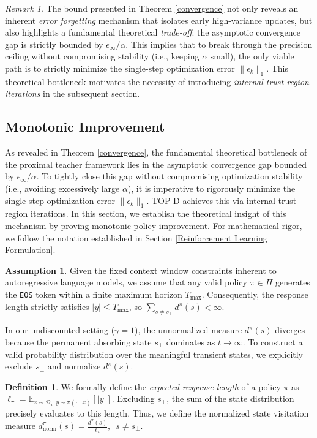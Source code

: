 \documentclass{article}
\theoremstyle{plain}
\theoremstyle{definition}
\newtheorem{definition}[theorem]{Definition}
\newtheorem{assumption}[theorem]{Assumption}
\theoremstyle{remark}
\newtheorem{remark}[theorem]{Remark}
\begin{document}
\begin{remark}
	The bound presented in Theorem \ref{convergence} not only reveals an inherent \textit{error forgetting} mechanism that isolates early high-variance updates, but also highlights a fundamental theoretical \textit{trade-off}: the asymptotic convergence gap is strictly bounded by $\epsilon_\infty/\alpha$. This implies that to break through the precision ceiling without compromising stability (i.e., keeping $\alpha$ small), the only viable path is to strictly minimize the single-step optimization error $\lVert\epsilon_k\rVert_1$. This theoretical bottleneck motivates the necessity of introducing \textit{internal trust region iterations} in the subsequent section.
\end{remark}


\subsection{Monotonic Improvement}\label{Monotonic Improvement}
As revealed in Theorem \ref{convergence}, the fundamental theoretical bottleneck of the proximal teacher framework lies in the asymptotic convergence gap bounded by $\epsilon_\infty/\alpha$. To tightly close this gap without compromising optimization stability (i.e., avoiding excessively large $\alpha$), it is imperative to rigorously minimize the single-step optimization error $\lVert\epsilon_k\rVert_1$. TOP-D achieves this via internal trust region iterations. In this section, we establish the theoretical insight of this mechanism by proving monotonic policy improvement. For mathematical rigor, we follow the notation established in Section \ref{Reinforcement Learning Formulation}.
\begin{assumption}\label{assumption 2}
	Given the fixed context window constraints inherent to autoregressive language models, we assume that any valid policy $\pi \in \Pi$ generates the \texttt{EOS} token within a finite maximum horizon $T_{\max}$. Consequently, the response length strictly satisfies $\lvert y\rvert \leq T_{\max}$, so $\sum_{s\neq s_\bot}d^{\pi}(s)<\infty$.
\end{assumption}
In our undiscounted setting ($\gamma=1$), the unnormalized measure $d^\pi(s)$ diverges because the permanent absorbing state $s_\bot$ dominates as $t \to \infty$. To construct a valid probability distribution over the meaningful transient states, we explicitly exclude $s_\bot$ and normalize $d^\pi(s)$.
\begin{definition}\label{normalized state distribution}
	We formally define the \textit{expected response length} of a policy $\pi$ as $\ell_\pi = \mathbb{E}_{x \sim \mathcal{D}_x, y \sim \pi(\cdot \mid x)}\left[\lvert y\rvert\right]$. Excluding $s_\bot$, the sum of the state distribution precisely evaluates to this length. Thus, we define the normalized state visitation measure $d^\pi_{\mathrm{norm}}(s) = \frac{d^\pi(s)}{\ell_\pi},\enspace s \neq s_\bot$.
\end{definition}
\end{document}
